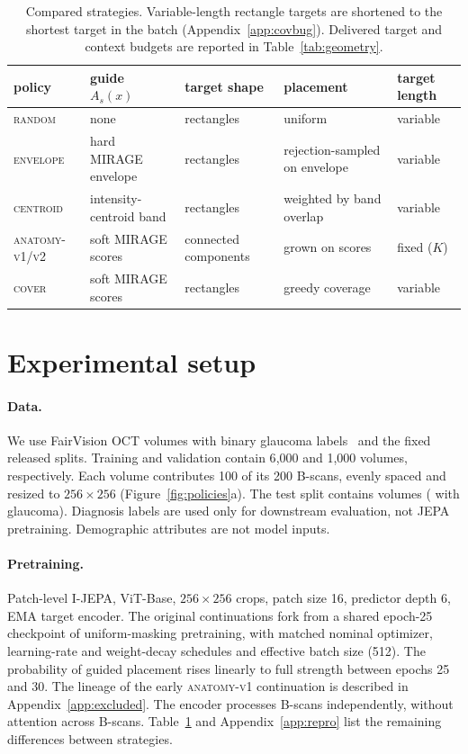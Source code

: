 \documentclass{article}
\newcommand{\ArmBest}{\textsc{centroid}}
\begin{document}
\begin{table}[t]
\centering
\caption{Compared strategies. Variable-length rectangle targets are shortened
to the shortest target in the batch (Appendix~\ref{app:covbug}). Delivered
target and context budgets are reported in Table~\ref{tab:geometry}.}
\label{tab:strategies}
\footnotesize
\setlength{\tabcolsep}{4pt}
\begin{tabular}{lllll}
\toprule
policy & guide $A_s(x)$ & target shape & placement & target length \\
\midrule
\textsc{random} & none & rectangles & uniform & variable \\
\textsc{envelope} & hard MIRAGE envelope & rectangles & rejection-sampled on envelope & variable \\
\ArmBest{} & intensity-centroid band & rectangles & weighted by band overlap & variable \\
\textsc{anatomy-v1/v2} & soft MIRAGE scores & connected components & grown on scores & fixed ($K$) \\
\textsc{cover} & soft MIRAGE scores & rectangles & greedy coverage & variable \\
\bottomrule
\end{tabular}
\end{table}

\section{Experimental setup}
\label{sec:setup}

\paragraph{Data.}
We use FairVision OCT volumes with binary glaucoma
labels~\citep{luo2024fairvision} and the fixed released splits.
Training and validation contain 6{,}000 and 1{,}000 volumes, respectively.
Each volume contributes 100 of its 200 B-scans, evenly spaced and resized to
$256{\times}256$ (Figure~\ref{fig:policies}a).
The test split contains \Ntest{} volumes (\Npos{} with glaucoma).
Diagnosis labels are used only for downstream evaluation, not JEPA pretraining.
Demographic attributes are not model inputs.

\paragraph{Pretraining.} Patch-level I-JEPA, ViT-Base, $256{\times}256$ crops,
patch size 16, predictor depth 6, EMA target encoder. The original
continuations fork from a shared epoch-25 checkpoint of uniform-masking
pretraining, with matched nominal optimizer, learning-rate and
weight-decay schedules and effective batch size (512).
The probability of guided placement rises linearly to full strength between
epochs 25 and 30. The lineage of the early \textsc{anatomy-v1} continuation is
described in Appendix~\ref{app:excluded}.
The encoder processes B-scans independently, without attention across
B-scans. Table~\ref{tab:strategies} and Appendix~\ref{app:repro} list the
remaining differences between strategies.
\end{document}
